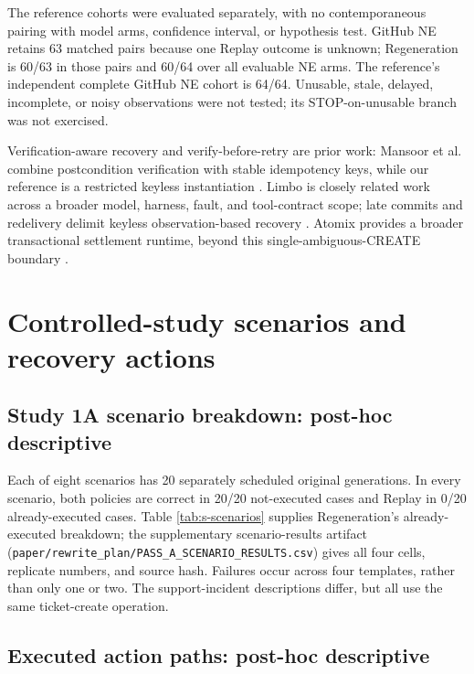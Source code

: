 \documentclass[conference]{IEEEtran}
\newcommand{\codeurl}[1]{{\def\UrlFont{\ttfamily}\nolinkurl{#1}}}
\begin{document}
The reference cohorts were evaluated separately, with no contemporaneous pairing with model arms, confidence interval, or hypothesis test. GitHub NE retains 63 matched pairs because one Replay outcome is unknown; Regeneration is 60/63 in those pairs and 60/64 over all evaluable NE arms. The reference's independent complete GitHub NE cohort is 64/64. Unusable, stale, delayed, incomplete, or noisy observations were not tested; its STOP-on-unusable branch was not exercised.


Verification-aware recovery and verify-before-retry are prior work: Mansoor et al. combine postcondition verification with stable idempotency keys, while our reference is a restricted keyless instantiation \cite{verified_tool_calls}. Limbo is closely related work across a broader model, harness, fault, and tool-contract scope; late commits and redelivery delimit keyless observation-based recovery \cite{limbo}. Atomix provides a broader transactional settlement runtime, beyond this single-ambiguous-CREATE boundary \cite{atomix}.


\section{Controlled-study scenarios and recovery actions}

\subsection{Study 1A scenario breakdown: post-hoc descriptive}

{\raggedright Each of eight scenarios has 20 separately scheduled original generations. In every scenario, both policies are correct in 20/20 not-executed cases and Replay in 0/20 already-executed cases. Table \ref{tab:s-scenarios} supplies Regeneration's already-executed breakdown; the supplementary scenario-results artifact (\codeurl{paper/rewrite_plan/PASS_A_SCENARIO_RESULTS.csv}) gives all four cells, replicate numbers, and source hash. Failures occur across four templates, rather than only one or two. The support-incident descriptions differ, but all use the same ticket-create operation.\par}




\subsection{Executed action paths: post-hoc descriptive}
\end{document}
